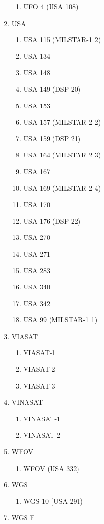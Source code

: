 \begin{multicols}{2}
\begin{enumerate}
\begin{enumerate}
    \item UFO 4 (USA 108)
  \end{enumerate}
  \item USA
  \begin{enumerate}
    \item USA 115 (MILSTAR-1 2)
    \item USA 134
    \item USA 148
    \item USA 149 (DSP 20)
    \item USA 153
    \item USA 157 (MILSTAR-2 2)
    \item USA 159 (DSP 21)
    \item USA 164 (MILSTAR-2 3)
    \item USA 167
    \item USA 169 (MILSTAR-2 4)
    \item USA 170
    \item USA 176 (DSP 22)
    \item USA 270
    \item USA 271
    \item USA 283
    \item USA 340
    \item USA 342
    \item USA 99 (MILSTAR-1 1)
  \end{enumerate}
  \item VIASAT
  \begin{enumerate}
    \item VIASAT-1
    \item VIASAT-2
    \item VIASAT-3
  \end{enumerate}
  \item VINASAT
  \begin{enumerate}
    \item VINASAT-1
    \item VINASAT-2
  \end{enumerate}
  \item WFOV
  \begin{enumerate}
    \item WFOV (USA 332)
  \end{enumerate}
  \item WGS
  \begin{enumerate}
    \item WGS 10 (USA 291)
  \end{enumerate}
  \item WGS F

\end{enumerate}
\end{multicols}
